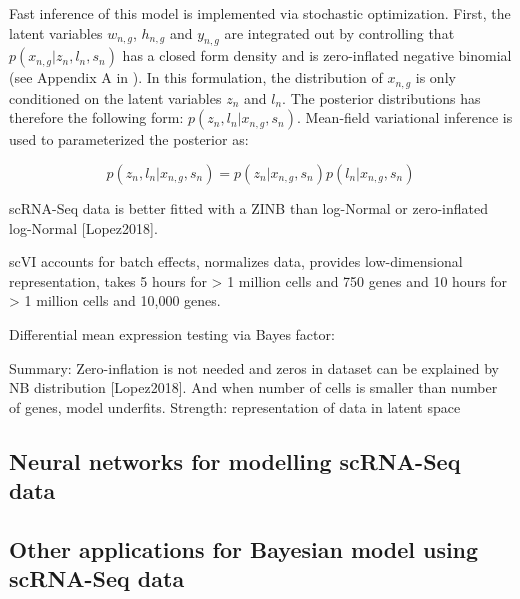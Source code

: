 Fast inference of this model is implemented via stochastic optimization. First, the latent variables $w_{n,g}$, $h_{n,g}$ and $y_{n,g}$ are integrated out by controlling that $p(x_{n,g}|z_n,l_n,s_n)$ has a closed form density and is zero-inflated negative binomial (see Appendix A in \citep{Lopez2018}). In this formulation, the distribution of $x_{n,g}$ is only conditioned on the latent variables $z_n$ and $l_n$. The posterior distributions has therefore the following form: $p(z_n,l_n|x_{n,g},s_n)$. Mean-field variational inference is used to parameterized the posterior as:

\begin{equation}
p(z_n,l_n|x_{n,g},s_n)=p(z_n|x_{n,g},s_n)p(l_n|x_{n,g},s_n)
\end{equation} 






scRNA-Seq data is better fitted with a ZINB than log-Normal or zero-inflated log-Normal [Lopez2018]. 

scVI accounts for batch effects, normalizes data, provides low-dimensional representation, takes 5 hours for > 1 million cells and 750 genes and 10 hours for > 1 million cells and 10,000 genes.

Differential mean expression testing via Bayes factor:



Summary: Zero-inflation is not needed and zeros in dataset can be explained by NB distribution [Lopez2018]. And when number of cells is smaller than number of genes, model underfits. Strength: representation of data in latent space


\subsection{Neural networks for modelling scRNA-Seq data}

\subsection{Other applications for Bayesian model using scRNA-Seq data}
 

